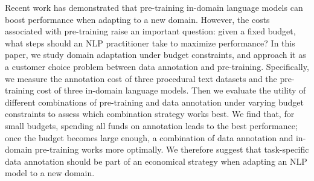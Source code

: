 Recent work has demonstrated that pre-training in-domain language models can boost performance when adapting to a new domain. However, the costs associated with pre-training raise an important question: given a fixed budget, what steps should an NLP practitioner take to maximize performance? In this paper, we study domain adaptation under budget constraints, and approach it as a customer choice problem between data annotation and pre-training. Specifically, we measure the annotation cost of three procedural text datasets and the pre-training cost of three in-domain language models. Then we evaluate the utility of different combinations of pre-training and data annotation under varying budget constraints to assess which combination strategy works best. We find that, for small budgets, spending all funds on annotation leads to the best performance; once the budget becomes large enough, a combination of data annotation and in-domain pre-training works more optimally. We therefore suggest that task-specific data annotation should be part of an economical strategy when adapting an NLP model to a new domain.
